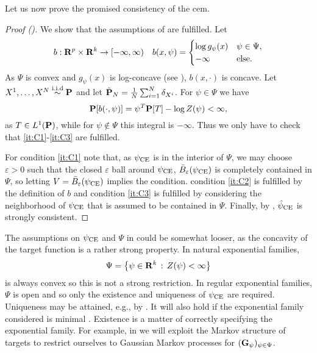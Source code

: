Let us now prove the promised consistency of the \acrshort{cem}.
\begin{proof}[Proof ()]
    We show that the assumptions of  are fulfilled. Let
    \begin{align*}
        b: \R^{p}\times \R^{k} \to [-\infty, \infty) && b(x, \psi) = \begin{cases}
            \log g_{\psi}(x) & \psi \in \Psi, \\
            - \infty & \text{else.}
        \end{cases} 
    \end{align*}
    As $\Psi$ is convex and $g_{\psi}(x)$ is log-concave (see ), $b(x, \cdot)$ is concave. Let $X^{1}, \dots, X^{N} \iid \P$ and let $\tilde{\P}_{N} = \frac{1}{N} \sum_{i = 1}^N \delta_{X^{i}}$. For $\psi \in \Psi$ we have
    $$
    \P [b(\cdot, \psi)] = \psi^{T}\P[T] - \log Z(\psi) < \infty,
    $$
    as $T \in L^{1}(\P)$, while for $\psi \notin \Psi$ this integral is $-\infty$. Thus we only have to check that \ref{it:C1}-\ref{it:C3} are fulfilled. 
    
    For condition \ref{it:C1} note that, as $\pce$ is in the interior of $\Psi$, we may choose $\varepsilon > 0$ such that the closed $\varepsilon$ ball around $\pce$, $\bar B_{\varepsilon} (\pce)$ is completely contained in $\Psi$, so letting $V = \bar B_{\varepsilon} (\pce)$ implies the condition. condition \ref{it:C2} is fulfilled by the definition of $b$ and condition \ref{it:C3} is fulfilled by considering the neighborhood of $\pce$ that is assumed to be contained in $\Psi$. Finally, by , $\hpce$ is strongly consistent.
\end{proof}

The assumptions on $\pce$ and $\Psi$ in  could be somewhat looser, as the concavity of the target function is a rather strong property. In natural exponential families, 
$$
\Psi = \left\{ \psi \in \R^{k} \,:\, Z(\psi) < \infty \right\}
$$
is always convex so this is not a strong restriction. In regular exponential families, $\Psi$ is open and so only the existence and uniqueness of $\pce$ are required. Uniqueness may be attained, e.g., by . It will also hold if the exponential family considered is minimal \citep[Corollary 2.5]{Brown1986Fundamentals}. Existence is a matter of correctly specifying the exponential family. For example, in  we will exploit the Markov structure of targets to restrict ourselves to Gaussian Markov processes for $(\G_{\psi})_{\psi \in \Psi}$. 

